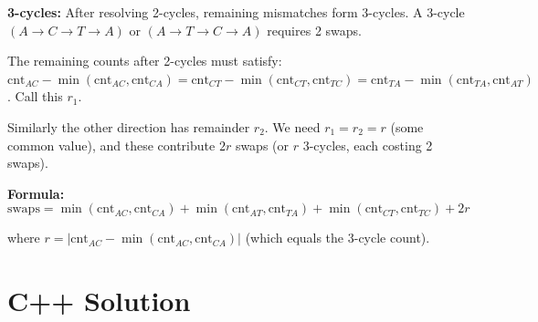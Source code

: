 \documentclass[11pt,a4paper]{article}
\begin{document}
\textbf{3-cycles:} After resolving 2-cycles, remaining mismatches form 3-cycles. A 3-cycle $(A \to C \to T \to A)$ or $(A \to T \to C \to A)$ requires 2 swaps.

The remaining counts after 2-cycles must satisfy: $\text{cnt}_{AC} - \min(\text{cnt}_{AC}, \text{cnt}_{CA}) = \text{cnt}_{CT} - \min(\text{cnt}_{CT}, \text{cnt}_{TC}) = \text{cnt}_{TA} - \min(\text{cnt}_{TA}, \text{cnt}_{AT})$. Call this $r_1$.

Similarly the other direction has remainder $r_2$. We need $r_1 = r_2 = r$ (some common value), and these contribute $2r$ swaps (or $r$ 3-cycles, each costing 2 swaps).

\textbf{Formula:}
\[\text{swaps} = \min(\text{cnt}_{AC}, \text{cnt}_{CA}) + \min(\text{cnt}_{AT}, \text{cnt}_{TA}) + \min(\text{cnt}_{CT}, \text{cnt}_{TC}) + 2r\]

where $r = |\text{cnt}_{AC} - \min(\text{cnt}_{AC}, \text{cnt}_{CA})|$ (which equals the 3-cycle count).

\section{C++ Solution}
\end{document}
